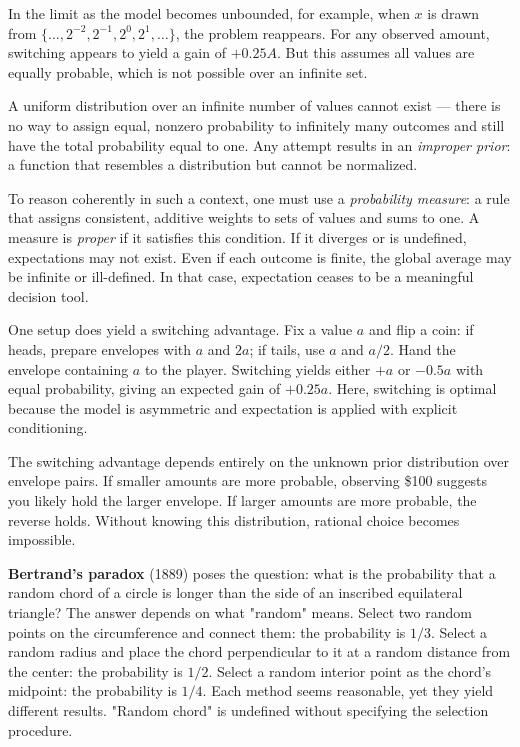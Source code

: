 In the limit as the model becomes unbounded, for example, when \( x \) is drawn from \( \{\dots, 2^{-2}, 2^{-1}, 2^0, 2^1, \dots\} \), the problem reappears. For any observed amount, switching appears to yield a gain of \( +0.25A \). But this assumes all values are equally probable, which is not possible over an infinite set.

A uniform distribution over an infinite number of values cannot exist — there is no way to assign equal, nonzero probability to infinitely many outcomes and still have the total probability equal to one. Any attempt results in an \emph{improper prior}: a function that resembles a distribution but cannot be normalized.

To reason coherently in such a context, one must use a \emph{probability measure}: a rule that assigns consistent, additive weights to sets of values and sums to one. A measure is \emph{proper} if it satisfies this condition. If it diverges or is undefined, expectations may not exist. Even if each outcome is finite, the global average may be infinite or ill-defined. In that case, expectation ceases to be a meaningful decision tool.

One setup does yield a switching advantage. Fix a value \( a \) and flip a coin: if heads, prepare envelopes with \( a \) and \( 2a \); if tails, use \( a \) and \( a/2 \). Hand the envelope containing \( a \) to the player. Switching yields either \( +a \) or \( -0.5a \) with equal probability, giving an expected gain of \( +0.25a \). Here, switching is optimal because the model is asymmetric and expectation is applied with explicit conditioning.

The switching advantage depends entirely on the unknown prior distribution over envelope pairs. If smaller amounts are more probable, observing \$100 suggests you likely hold the larger envelope. If larger amounts are more probable, the reverse holds. Without knowing this distribution, rational choice becomes impossible.

\textbf{Bertrand's paradox} (1889) poses the question: what is the probability that a random chord of a circle is longer than the side of an inscribed equilateral triangle? The answer depends on what "random" means. Select two random points on the circumference and connect them: the probability is $1/3$. Select a random radius and place the chord perpendicular to it at a random distance from the center: the probability is $1/2$. Select a random interior point as the chord's midpoint: the probability is $1/4$. Each method seems reasonable, yet they yield different results. "Random chord" is undefined without specifying the selection procedure.

